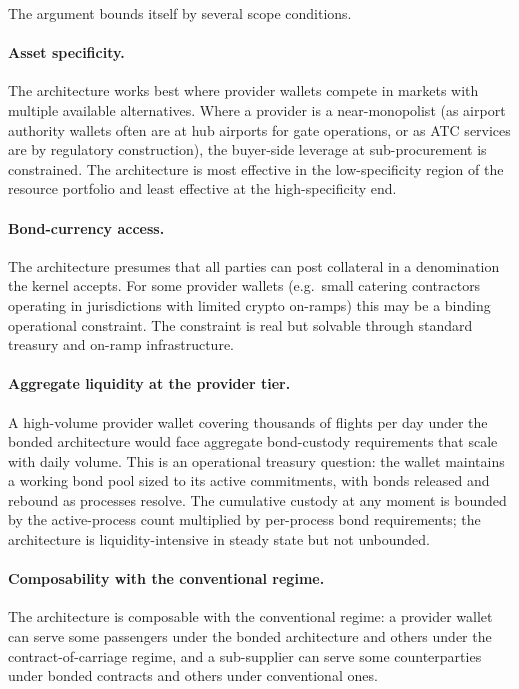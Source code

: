 \documentclass[11pt,a4paper]{article}
\theoremstyle{definition}
\theoremstyle{remark}
\begin{document}
The argument bounds itself by several scope conditions.

\paragraph{Asset specificity.}
The architecture works best where provider wallets compete in
markets with multiple available alternatives. Where a provider is
a near-monopolist (as airport authority wallets often are at hub
airports for gate operations, or as ATC services are by
regulatory construction), the buyer-side leverage at
sub-procurement is constrained. The architecture is most effective
in the low-specificity region of the resource portfolio and least
effective at the high-specificity end.

\paragraph{Bond-currency access.}
The architecture presumes that all parties can post collateral in
a denomination the kernel accepts. For some provider wallets
(e.g.\ small catering contractors operating in jurisdictions with
limited crypto on-ramps) this may be a binding operational
constraint. The constraint is real but solvable through standard
treasury and on-ramp infrastructure.

\paragraph{Aggregate liquidity at the provider tier.}
A high-volume provider wallet covering thousands of flights per
day under the bonded architecture would face aggregate
bond-custody requirements that scale with daily volume. This is
an operational treasury question: the wallet maintains a working
bond pool sized to its active commitments, with bonds released
and rebound as processes resolve. The cumulative custody at any
moment is bounded by the active-process count multiplied by
per-process bond requirements; the architecture is
liquidity-intensive in steady state but not unbounded.

\paragraph{Composability with the conventional regime.}
The architecture is composable with the conventional regime: a
provider wallet can serve some passengers under the bonded
architecture and others under the contract-of-carriage regime,
and a sub-supplier can serve some counterparties under bonded
contracts and others under conventional ones.
\end{document}

